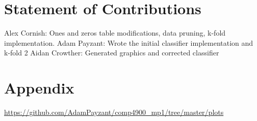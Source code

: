 \section{Statement of Contributions}

Alex Cornish: Ones and zeros table modifications, data pruning, k-fold implementation.
Adam Payzant: Wrote the initial classifier implementation and k-fold 2
Aidan Crowther: Generated graphics and corrected classifier

\section{Appendix}

\url{https://github.com/AdamPayzant/comp4900_mp1/tree/master/plots}



